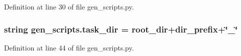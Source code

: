 Definition at line 30 of file gen\+\_\+scripts.\+py.

\hypertarget{namespacegen__scripts_a47a040de28afdc7e4ddac88b19d0a879}{
\subsubsection[{task\+\_\+dir}]{\setlength{\rightskip}{0pt plus 5cm}string gen\+\_\+scripts.\+task\+\_\+dir = {\bf root\+\_\+dir}+{\bf dir\+\_\+prefix}+\char`\"{}\+\_\+\char`\"{}}}\label{namespacegen__scripts_a47a040de28afdc7e4ddac88b19d0a879}


Definition at line 44 of file gen\+\_\+scripts.\+py.

